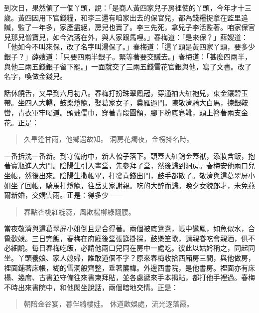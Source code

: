到次日，果然領了一個丫頭，說：「是商人黃四家兒子房裡使的丫頭，今年才十三歲。黃四因用下官錢糧，和李三還有咱家出去的保官兒，都為錢糧捉拿在監里追贓，監了一年多，家產盡絕，房兒也賣了。李三先死，拿兒子李活監著。咱家保官兒那兒僧寶兒，如今流落在外，與人家跟馬哩。」春梅道：「是來保？」薛嫂道：「他如今不叫來保，改了名字叫湯保了。」春梅道：「這丫頭是黃四家丫頭，要多少銀子？」薛嫂道：「只要四兩半銀子。緊等著要交贓去。」春梅道：「甚麼四兩半，與他三兩五錢銀子留下罷。」一面就交了三兩五錢雪花官銀與他，寫了文書。改了名字，喚做金錢兒。

話休饒舌，又早到六月初八。春梅打扮珠翠鳳冠，穿通袖大紅袍兒，束金鑲碧玉帶。坐四人大轎，鼓樂燈籠，娶葛家女子，奠雁過門。陳敬濟騎大白馬，揀銀鞍轡，青衣軍牢喝道。頭戴儒巾，穿著青段圓領，腳下粉底皂靴，頭上簪著兩支金花。正是：
\begin{quote}
久旱逢甘雨，他鄉遇故知。
洞房花燭夜，金榜掛名時。
\end{quote}
一番拆洗一番新。到守備府中，新人轎子落下。頭蓋大紅銷金蓋袱，添妝含飯，抱著寶瓶進入大門。陰陽生引入畫堂，先參拜了堂，然後歸到洞房。春梅安他兩口兒坐帳，然後出來。陰陽生撒帳畢，打發喜錢出門，鼓手都散了。敬濟與這葛翠屏小姐坐了回帳，騎馬打燈籠，往岳丈家謝親。吃的大醉而歸。晚夕女貌郎才，未免燕爾新婚，交媾雲雨。正是：得多少——
\begin{quote}
春點杏桃紅綻蕊，風欺楊柳綠翻腰。
\end{quote}

當夜敬濟與這葛翠屏小姐倒且是合得著。兩個被底鴛鴦，帳中鸞鳳，如魚似水，合巹歡娛。三日完飯，春梅在府廳後堂張筵掛採，鼓樂笙歌，請親眷吃會親酒，俱不必細說。每日春梅吃飯，必請他兩口兒同在房中一處吃。彼此以姑妗稱之，同起同坐。丫頭養娘、家人媳婦，誰敢道個不字？原來春梅收拾西廂房三間，與他做房，裡面鋪著床帳，糊的雪洞般齊整，垂著簾幃。外邊西書院，是他書房。裡面亦有床榻、幾席、古書並守備往來書柬拜貼，並各處遞來手本揭貼，都打他手裡過。春梅不時出來書院中，和他閑坐說話，兩個暗地交情。正是：
\begin{quote}
朝陪金谷宴，暮伴綺樓娃。
休道歡娛處，流光逐落霞。
\end{quote}
